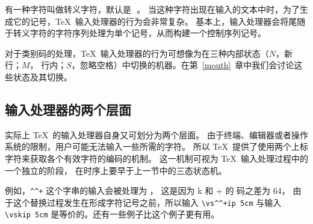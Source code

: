 \documentclass{book}
\begin{document}
有一种字符叫做转义字符，默认是~\cs{}$\,$。
当这种字符出现在输入的文本中时，为了生成它的记号，\TeX\ 输入处理器的行为会非常复杂。
基本上，输入处理器会将尾随于转义字符的字符序列处理为单个记号，从而构建一个控制序列记号。

对于类别码的处理，\TeX\ 输入处理器的行为可想像为在三种内部状态（$N$，新行；$M$，
行内；$S$，忽略空格）中切换的机器。在第~\ref{mouth}~章中我们会讨论这些状态及其切换。

\subsection{输入处理器的两个层面}

实际上 \TeX\ 的输入处理器自身又可划分为两个层面。
由于终端、编辑器或者操作系统的限制，用户可能无法输入一些所需的字符。
所以 \TeX\ 提供了使用两个上标字符来获取各个有效字符的编码的机制。
这一机制可视为 \TeX\ 输入处理过程中的一个独立的阶段，
在时序上要早于上一节中的三态状态机。

例如，\verb>^^+> 这个字串的输入会被处理为 ，
这是因为 \n k 和 \n + 的 \ascii{} 码之差为 64，
由于这个替换过程发生在形成字符记号之前，所以输入 \verb>\vs^^+ip 5cm>
与输入 \verb>\vskip 5cm> 是等价的。还有一些例子比这个例子更有用。
\end{document}
